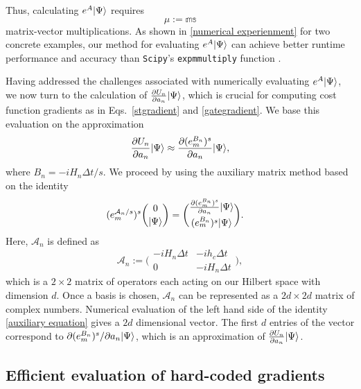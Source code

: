 Thus, calculating $e^A|\Psi\rangle$ requires
\begin{equation}
\label{mudefnition}
    \mu:=\mathbb{m}\mathbb{s}
\end{equation}
matrix-vector multiplications. As shown in   \ref{numerical experienment} for two concrete examples, our method for evaluating $e^A|\Psi\rangle$ can achieve better runtime performance and accuracy than \texttt{Scipy}'s \texttt{expm\textunderscore multiply} function \cite{al2011computing} .

Having addressed the challenges associated with numerically evaluating $e^A|\Psi\rangle$, we now turn to the calculation of $\frac{\partial U_n}{\partial a_n} |\Psi\rangle$, which is crucial for computing cost function gradients as in Eqs.\ \eqref{stgradient} and \eqref{gategradient}. We base this evaluation on the approximation 
\begin{align}
    \frac{\partial U_n}{\partial a_n} |\Psi\rangle\approx \frac{\partial (e^{B_n}_m)^s}{\partial a_n} |\Psi\rangle,
\end{align}
where $B_n={-iH_n\Delta t}/{s}$. We proceed by using the auxiliary matrix method based on the identity \cite{auxigoodwin2015auxiliary,najfeld1995derivatives}
\begin{equation}
\label{auxiliary equation}
    \begin{aligned}
    (e^{\mathcal{A}_n/s}_m)^s
    \binom{0}{|\Psi\rangle}&=
    \binom{
    \frac{\partial (e^{B_{n}}_m)^s}{\partial a_n}  |\Psi\rangle}{{(e^{B_n}_m)^s|\Psi\rangle}}.
\end{aligned}
\end{equation}
Here, $\mathcal{A}_n$ is defined as
\begin{equation}
\mathcal{A}_n:=
{\biggl(\begin{matrix}
-iH_n \Delta t& -ih_c\Delta t \\
0 & -iH_n\Delta t
\end{matrix}\biggr)},
\end{equation}
which is a $2\times2$ matrix of operators each acting on our Hilbert space with dimension $d$. Once a basis is chosen, $\mathcal{A}_n$ can be represented as a $2d\times2d$ matrix of complex numbers. Numerical evaluation of the left hand side of the identity \eqref{auxiliary equation} gives a $2d$ dimensional vector. The first $d$ entries of the vector correspond to $\partial (e^{B_n}_m)^s / \partial a_n |\Psi\rangle$, which is an approximation of $\frac{\partial U_n}{\partial a_n} |\Psi\rangle$. 

\subsection{Efficient evaluation of hard-coded gradients}
\label{Computationally and memory efficient algorithm}

